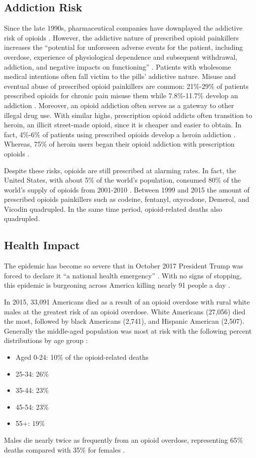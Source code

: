 \documentclass[sigconf]{acmart}
\begin{document}
\subsection{Addiction Risk}
Since the late 1990s, pharmaceutical companies have downplayed the addictive risk of opioids \cite{opsis1}. However, the addictive nature of prescribed opioid painkillers increases the ``potential for unforeseen adverse events for the patient, including overdose, experience of physiological dependence and subsequent withdrawal, addiction, and negative impacts on functioning'' \cite{Vowles01}. Patients with wholesome medical intentions often fall victim to the pills' addictive nature. Misuse and eventual abuse of prescribed opioid painkillers are common: 21\%-29\% of patients prescribed opioids for chronic pain misuse them while 7.8\%-11.7\% develop an addiction \cite{Vowles01}. Moreover, an opioid addiction often serves as a gateway to other illegal drug use. With similar highs, prescription opioid addicts often transition to heroin, an illicit street-made opioid, since it is cheaper and easier to obtain. In fact, 4\%-6\% of patients using prescribed opioids develop a heroin addiction \cite{opsis1}. Whereas, 75\% of heroin users began their opioid addiction with prescription opioids \cite{Cicero01}.

Despite these risks, opioids are still prescribed at alarming rates. In fact, the United States, with about 5\% of the world's population, consumed 80\% of the world's supply of opioids from 2001-2010 \cite{Vowles01}. Between 1999 and 2015 the amount of prescribed opioids painkillers such as codeine, fentanyl, oxycodone, Demerol, and Vicodin quadrupled. In the same time period, opioid-related deaths also quadrupled.
 
\subsection{Health Impact}
The epidemic has become so severe that in October 2017 President Trump was forced to declare it ``a national health emergency'' \cite{opsis3}.    With no signs of stopping, this epidemic is burgeoning across America killing nearly 91 people a day \cite{opsis10}.
 
In 2015, 33,091 Americans died as a result of an opioid overdose with rural white males at the greatest risk of an opioid overdose.  White Americans (27,056) died the most, followed by black Americans (2,741), and Hispanic American (2,507). Generally the middle-aged population was most at risk with the following percent distributions by age group \cite{opsis4}:
\begin{itemize}
\item Aged 0-24: 10\% of the opioid-related deaths
\item 25-34: 26\% 
\item 35-44: 23\% 
\item 45-54: 23\% 
\item 55+: 19\% 
\end{itemize}
Males die nearly twice as frequently from an opioid overdose, representing 65\% deaths compared with 35\% for females \cite{opsis4}.
\end{document}
